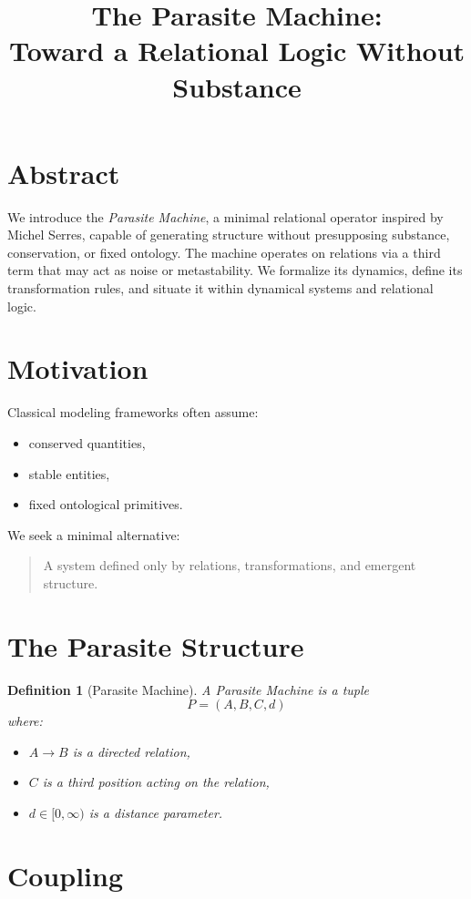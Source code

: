 \documentclass[11pt]{article}
\title{The Parasite Machine:\\Toward a Relational Logic Without Substance}
\author{}
\date{}
\newtheorem{definition}{Definition}
\begin{document}
\maketitle

\section*{Abstract}
We introduce the \emph{Parasite Machine}, a minimal relational operator inspired by Michel Serres, capable of generating structure without presupposing substance, conservation, or fixed ontology. The machine operates on relations via a third term that may act as noise or metastability. We formalize its dynamics, define its transformation rules, and situate it within dynamical systems and relational logic.

\section{Motivation}

Classical modeling frameworks often assume:
\begin{itemize}
\item conserved quantities,
\item stable entities,
\item fixed ontological primitives.
\end{itemize}

We seek a minimal alternative:
\begin{quote}
A system defined only by relations, transformations, and emergent structure.
\end{quote}

\section{The Parasite Structure}

\begin{definition}[Parasite Machine]
A Parasite Machine is a tuple
\[
P = (A, B, C, d)
\]
where:
\begin{itemize}
\item $A \rightarrow B$ is a directed relation,
\item $C$ is a third position acting on the relation,
\item $d \in [0,\infty)$ is a distance parameter.
\end{itemize}
\end{definition}

\section{Coupling}
\end{document}
